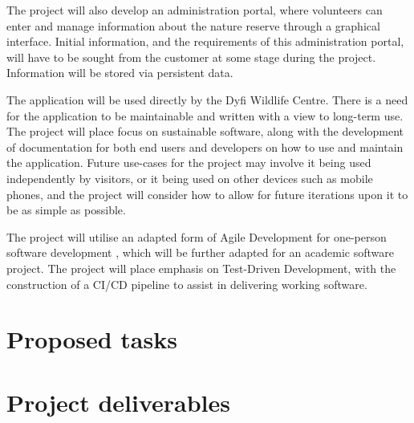\documentclass[11pt,fleqn,twoside]{article}
\begin{document}
The project will also develop an administration portal, where volunteers can enter and manage information about the nature reserve through a graphical interface. Initial information, and the requirements of this administration portal, will have to be sought from the customer at some stage during the project. Information will be stored via persistent data.

The application will be used directly by the Dyfi Wildlife Centre. There is a need for the application to be maintainable and written with a view to long-term use. The project will place focus on sustainable software, along with the development of documentation for both end users and developers on how to use and maintain the application. Future use-cases for the project may involve it being used independently by visitors, or it being used on other devices such as mobile phones, and the project will consider how to allow for future iterations upon it to be as simple as possible.

The project will utilise an adapted form of Agile Development for one-person software development \cite{nystrom_2011}, which will be further adapted for an academic software project. The project will place emphasis on Test-Driven Development, with the construction of a CI/CD pipeline to assist in delivering working software.

\section{Proposed tasks}


\section{Project deliverables}

\end{document}
